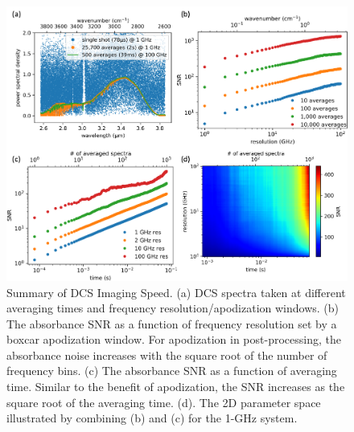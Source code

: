 \documentclass{optica-article}
\begin{document}



\begin{figure}[H]
    \centering
    \includegraphics[width=\linewidth]{snr_analysis_v3.png}
    \caption{Summary of DCS Imaging Speed. (a) DCS spectra taken at different averaging times and frequency resolution/apodization windows. (b) The absorbance SNR as a function of frequency resolution set by a boxcar apodization window. For apodization in post-processing, the absorbance noise increases with the square root of the number of frequency bins. (c) The absorbance SNR as a function of averaging time. Similar to the benefit of apodization, the SNR increases as the square root of the averaging time. (d). The 2D parameter space illustrated by combining (b) and (c) for the 1-GHz system.}
    \label{fig:snr_analysis}
\end{figure}
\end{document}
